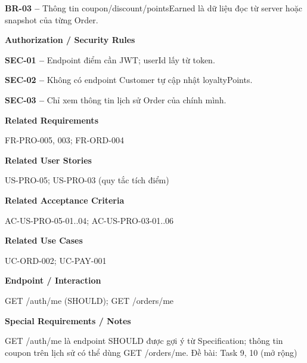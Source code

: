 \documentclass[11pt,a4paper,oneside]{report}
\begin{document}
\textbf{BR-03 --} Thông tin coupon/discount/pointsEarned là dữ liệu đọc từ server hoặc snapshot của từng Order.
\par

\par\smallskip\noindent\textcolor{sgublue}{\textbf{Authorization / Security Rules}}\par\nobreak
\textbf{SEC-01 --} Endpoint điểm cần JWT; userId lấy từ token.

\textbf{SEC-02 --} Không có endpoint Customer tự cập nhật loyaltyPoints.

\textbf{SEC-03 --} Chỉ xem thông tin lịch sử Order của chính mình.
\par

\par\smallskip\noindent\textcolor{sgublue}{\textbf{Related Requirements}}\par\nobreak
FR-PRO-005, 003; FR-ORD-004
\par

\par\smallskip\noindent\textcolor{sgublue}{\textbf{Related User Stories}}\par\nobreak
US-PRO-05; US-PRO-03 (quy tắc tích điểm)
\par

\par\smallskip\noindent\textcolor{sgublue}{\textbf{Related Acceptance Criteria}}\par\nobreak
AC-US-PRO-05-01..04; AC-US-PRO-03-01..06
\par

\par\smallskip\noindent\textcolor{sgublue}{\textbf{Related Use Cases}}\par\nobreak
UC-ORD-002; UC-PAY-001
\par

\par\smallskip\noindent\textcolor{sgublue}{\textbf{Endpoint / Interaction}}\par\nobreak
GET /auth/me (SHOULD); GET /orders/me
\par

\par\smallskip\noindent\textcolor{sgublue}{\textbf{Special Requirements / Notes}}\par\nobreak
GET /auth/me là endpoint SHOULD được gợi ý từ Specification; thông tin coupon trên lịch sử có thể dùng GET /orders/me. \textbar{} Đề bài: Task 9, 10 (mở rộng)
\par
\end{document}
